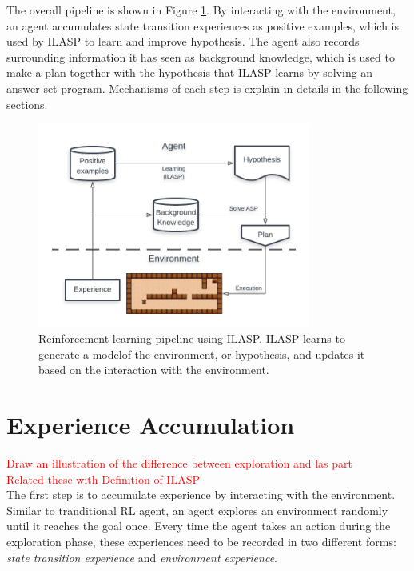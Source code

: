 
The overall pipeline is shown in Figure \ref{fig:pipeline}. By interacting with the environment, an agent accumulates state transition experiences as positive examples, which is used by ILASP to learn and improve hypothesis.
The agent also records surrounding information it has seen as background knowledge, which is used to make a plan together with the hypothesis that ILASP learns by solving an answer set program. 
Mechanisms of each step is explain in details in the following sections. 

\begin{figure}[!htb]
\centering
\includegraphics[width=0.8\textwidth]{./figures/architecture}
\caption{Reinforcement learning pipeline using ILASP. ILASP learns to generate a modelof the environment, or hypothesis, and updates it based on the interaction with the environment. }
\label{fig:pipeline}
\end{figure}

\section{Experience Accumulation}
\label{experience_accumulation}
\textcolor{red}{Draw an illustration of the difference between exploration and las part}\\
\textcolor{red}{Related these with Definition of ILASP}\\
The first step is to accumulate experience by interacting with the environment. Similar to tranditional RL agent, an agent explores an environment randomly until it reaches the goal once. 
Every time the agent takes an action during the exploration phase, these experiences need to be recorded in two different forms: \textit{state transition experience} and \textit{environment experience}.

